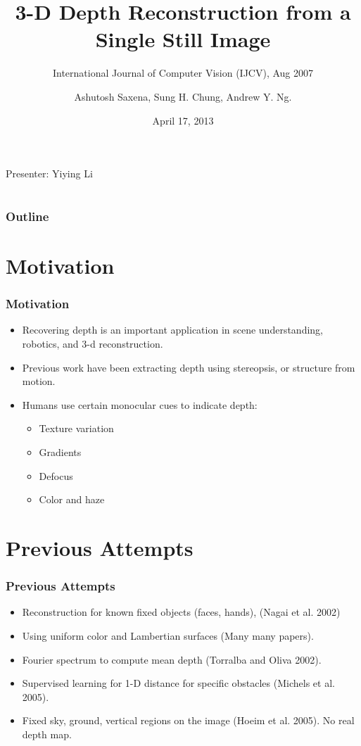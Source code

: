 \documentclass[handout]{beamer}
\title{3-D Depth Reconstruction from a Single Still Image}
\subtitle{International Journal of Computer Vision (IJCV), Aug 2007}
\author{Ashutosh Saxena, Sung H. Chung, Andrew Y. Ng.}
\date{April 17, 2013}
\newcommand{\vitem}{\vfill\item}
\begin{document}
\begin{frame}
    \titlepage
    \center\noindent Presenter: Yiying Li
\end{frame}

\section[Outline]{}

\begin{frame}
    \frametitle{Outline}
    \tableofcontents
\end{frame}

\section{Motivation}

\begin{frame}[t]\frametitle{Motivation}
    \begin{itemize}
        \item Recovering depth is an important application in scene understanding, robotics, and 3-d reconstruction.
        \vitem<+-> Previous work have been extracting depth using stereopsis, or structure from motion.
        \vitem<+-> Humans use certain monocular cues to indicate depth:
        \begin{itemize}
            \item Texture variation
            \item Gradients
            \item Defocus
            \item Color and haze
        \end{itemize}
    \end{itemize}
\end{frame}

\section{Previous Attempts}
\begin{frame}[t]\frametitle{Previous Attempts}
    \begin{itemize}
        \item Reconstruction for known fixed objects (faces, hands), (Nagai et al. 2002)
        \vitem<+-> Using uniform color and Lambertian surfaces (Many many papers).
        \vitem<+-> Fourier spectrum to compute mean depth (Torralba and Oliva 2002).
        \vitem<+-> Supervised learning for 1-D distance for specific obstacles (Michels et al. 2005).
        \vitem<+-> Fixed sky, ground, vertical regions on the image (Hoeim et al. 2005). No real depth map.
    \end{itemize}
\end{frame}
\end{document}
